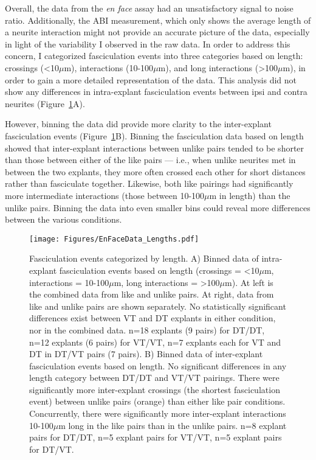 Overall, the data from the \emph{en face} assay had an unsatisfactory signal to noise ratio.
Additionally, the ABI measurement, which only shows the average length of a neurite interaction might not provide an accurate picture of the data, especially in light of the variability I observed in the raw data.
In order to address this concern, I categorized fasciculation events into three categories based on length: crossings (<10$\mu$m), interactions (10-100$\mu$m), and long interactions (>100$\mu$m), in order to gain a more detailed representation of the data.
This analysis did not show any differences in intra-explant fasciculation events between ipsi and contra neurites (Figure~\ref{Figures/EnFaceDataLengths}A).

However, binning the data did provide more clarity to the inter-explant fasciculation events (Figure~\ref{Figures/EnFaceDataLengths}B).
Binning the fasciculation data based on length showed that inter-explant interactions between unlike pairs tended to be shorter than those between either of the like pairs --- i.e., when unlike neurites met in between the two explants, they more often crossed each other for short distances rather than fasciculate together.
Likewise, both like pairings had significantly more intermediate interactions (those between 10-100$\mu$m in length) than the unlike pairs.
Binning the data into even smaller bins could reveal more differences between the various conditions.
\begin{figure}[hbtp]
    \begin{center}
        \texttt{[image: Figures/EnFaceData\_Lengths.pdf]}
        \caption[Fasciculation events categorized by length.]
        {Fasciculation events categorized by length.
        A) Binned data of intra-explant fasciculation events based on length (crossings = <10$\mu$m, interactions = 10-100$\mu$m, long interactions = >100$\mu$m).
        At left is the combined data from like and unlike pairs.
        At right, data from like and unlike pairs are shown separately.
        No statistically significant differences exist between VT and DT explants in either condition, nor in the combined data.
        n=18 explants (9 pairs) for DT/DT, n=12 explants (6 pairs) for VT/VT, n=7 explants each for VT and DT in DT/VT pairs (7 pairs).
        B) Binned data of inter-explant fasciculation events based on length.
        No significant differences in any length category between DT/DT and VT/VT pairings.
        There were significantly more inter-explant crossings (the shortest fasciculation event) between unlike pairs (orange) than either like pair conditions.
        Concurrently, there were significantly more inter-explant interactions 10-100$\mu$m long in the like pairs than in the unlike pairs.
        n=8 explant pairs for DT/DT, n=5 explant pairs for VT/VT, n=5 explant pairs for DT/VT.
        }
        \label{Figures/EnFaceDataLengths}
    \end{center}
\end{figure}

